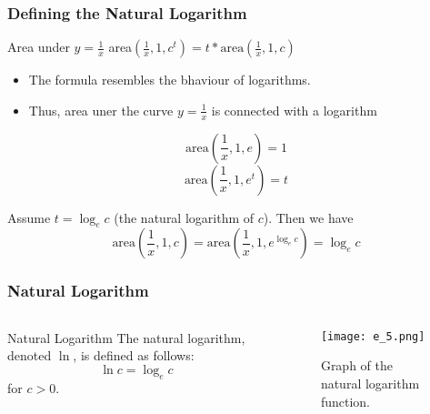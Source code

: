 \begin{frame}
  \frametitle{Defining the Natural Logarithm}
  \begin{block}{Area under \(y = \frac{1}{x}\)}
      area\((\frac{1}{x},1,c^{t}) = t*\text{area}(\frac{1}{x},1,c) \)
  \end{block}
  \begin{itemize}
    \item The formula resembles the bhaviour of logarithms.
    \item Thus, area uner the curve \(y = \frac{1}{x}\) is connected with a logarithm
  \end{itemize}
  \[\text{area}(\frac{1}{x},1,e) = 1 \]
\[\text{area}(\frac{1}{x},1,e^{t}) = t \]

Assume \(t = \log_e c\) (the natural logarithm of \(c\)). Then we have
\[\text{area}(\frac{1}{x},1,c) = \text{area}(\frac{1}{x},1,e^{\log_e c}) = \log_e c\]  
\end{frame}


\begin{frame}
  \frametitle{Natural Logarithm}
  \begin{columns}
    \begin{column}{0.5\textwidth}
      \begin{block}{Natural Logarithm}
        The natural logarithm, denoted \(\ln\), is defined as follows:
        \[
          \ln c = \log_e c
        \]
        for \(c > 0\).
      \end{block}
    \end{column}
    \begin{column}{0.5\textwidth}
      \begin{figure}
        \centering
        \texttt{[image: e\_5.png]}
        \caption{Graph of the natural logarithm function.}
      \end{figure}
    \end{column}
  \end{columns}
\end{frame}